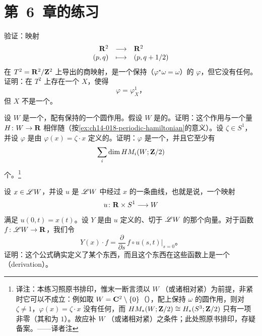 
\section{第~6~章的练习}
\label{sec:ch14-exercises-ch6}

\begin{exercise}\label{ex:ch14-022-torus-translation}
验证：映射
\[
\begin{array}{rcl}
\mathbf{R}^2 & \longrightarrow & \mathbf{R}^2\\
(p,q) & \longmapsto & (p,q+1/2)
\end{array}
\]
在\trTorus{} $T^2=\mathbf{R}^2/\mathbf{Z}^2$ 上导出的商映射，是一个保持\trSymplecticForm{}（$\varphi^\star\omega=\omega$）的\trDiffeomorphism{} $\varphi$，但它没有任何\trFixedPoint。证明：在 $T^2$ 上存在一个\trVectorField{} $X$，使得
\[
\varphi=\varphi_X^1\text{，}
\]
但 $X$ 不是一个\trHamiltonian\trVectorField。
\end{exercise}

\begin{exercise}\label{ex:ch14-023-circle-action-fixed-points}
设 $W$ 是一个\trSymplectic\trManifold，配有保持\trSymplecticForm{}的一个圆作用。假设 $W$ 是\trSimplyConnected{}的。证明：这个作用与一个\trPeriodic\trHamiltonian{}量 $H\colon W\to\mathbf{R}$ 相伴随（按\cref{ex:ch14-018-periodic-hamiltonian}的意义）。设 $\zeta\in S^1$，并设 $\varphi$ 是由 $\varphi(x)=\zeta\cdot x$ 定义的\trDiffeomorphism。证明：$\varphi$ 是一个\trHamiltonian\trDiffeomorphism，并且它至少有
\[
\sum_i\dim HM_i(W;\mathbf{Z}/2)
\]
个\trFixedPoint。\footnote{译注：本练习照原书排印，惟末一断言须以 $W$ \trCompact{}（或诸\trTrajectory{}相对紧）为前提，非紧时它可以不成立：例如取 $W=\mathbf{C}^2\setminus\{0\}$（\trSimplyConnected{}），配上保持 $\omega$ 的\trHopf{}圆作用，则对 $\zeta\neq1$，$\varphi(x)=\zeta\cdot x$ 没有任何\trFixedPoint，而 $HM_*(W;\mathbf{Z}/2)\cong H_*(S^3;\mathbf{Z}/2)$ 只有一项非零（其和为 $1$）。故应补 $W$ \trCompact{}（或诸\trTrajectory{}相对紧）之条件；此处照原书排印，存疑备案。——译者注}
\end{exercise}

\begin{exercise}\label{ex:ch14-024-loop-space-derivation}
设 $x\in\mathscr{L}W$，并设 $u$ 是 $\mathscr{L}W$ 中经过 $x$ 的一条曲线，也就是说，一个映射
\[
u\colon\mathbf{R}\times S^1\longrightarrow W
\]
满足 $u(0,t)=x(t)$。设 $Y$ 是由 $u$ 定义的、切于 $\mathscr{L}W$ 的那个向量。对于函数 $f\colon\mathscr{L}W\to\mathbf{R}$，我们令
\[
Y(x)\cdot f=\frac{\partial}{\partial s}\,f\circ u(s,t)\big|_{s=0}\text{。}
\]
证明：这个公式确实定义了某个东西，而且这个东西在这些函数上是一个\textbf{\trDerivation}（derivation）。
\end{exercise}

